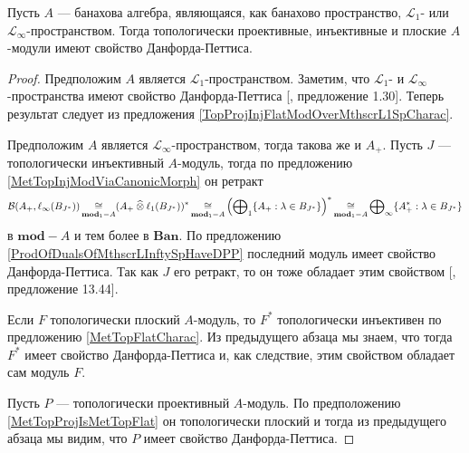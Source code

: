 \begin{theorem}\label{TopProjInjFlatModOverMthscrL1OrLInftySpHaveDPP} Пусть $A$ --- банахова алгебра, являющаяся, как банахово пространство, $\mathscr{L}_1$- или $\mathscr{L}_\infty$-пространством. Тогда топологически проективные, инъективные и плоские $A$-модули имеют свойство Данфорда-Петтиса.
\end{theorem}
\begin{proof} Предположим $A$ является $\mathscr{L}_1$-пространством. Заметим, что $\mathscr{L}_1$- и $\mathscr{L}_\infty$-пространства имеют свойство Данфорда-Петтиса [\cite{BourgNewClOfLpSp}, предложение 1.30]. Теперь результат следует из предложения \ref{TopProjInjFlatModOverMthscrL1SpCharac}.

Предположим $A$ является $\mathscr{L}_\infty$-пространством, тогда такова же и $A_+$. Пусть $J$ --- топологически инъективный $A$-модуль, тогда по предложению \ref{MetTopInjModViaCanonicMorph} он ретракт
$$
\mathcal{B}(A_+,\ell_\infty(B_{J^*}))\mathop{\mathbin{\cong}}\limits_{\mathbf{mod}_1-A}(A_+\mathbin{\widehat{\otimes}}\ell_1(B_{J^*}))^*\mathop{\mathbin{\cong}}\limits_{\mathbf{mod}_1-A}
\left(\bigoplus\nolimits_1\{ A_+:\lambda\in B_{J^*}\}\right)^*\mathop{\mathbin{\cong}}\limits_{\mathbf{mod}_1-A}
\bigoplus\nolimits_\infty\{ A_+^*:\lambda\in B_{J^*}\}
$$ 
в $\mathbf{mod}-A$ и тем более в $\mathbf{Ban}$. По предложению \ref{ProdOfDualsOfMthscrLInftySpHaveDPP} последний модуль имеет свойство Данфорда-Петтиса. Так как $J$ его ретракт, то он тоже обладает этим свойством [\cite{FabHabBanSpTh}, предложение 13.44]. 

Если $F$ топологически плоский $A$-модуль, то $F^*$ топологически инъективен по предложению \ref{MetTopFlatCharac}. Из предыдущего абзаца мы знаем, что тогда $F^*$ имеет свойство Данфорда-Петтиса и, как следствие, этим свойством обладает сам модуль $F$.

Пусть $P$ --- топологически проективный $A$-модуль. По предположению \ref{MetTopProjIsMetTopFlat} он топологически плоский и тогда из предыдущего абзаца мы видим, что $P$ имеет свойство Данфорда-Петтиса.
\end{proof}

